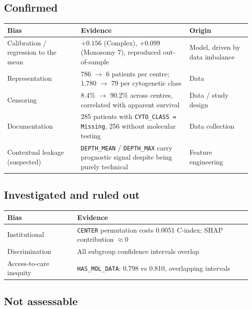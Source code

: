 \documentclass[11pt,a4paper]{article}
\newcommand{\var}[1]{\texttt{#1}}                      %
\begin{document}
\subsection{Confirmed}

\begin{longtable}{@{}p{4.2cm} p{6.5cm} p{3.8cm}@{}}
\toprule
\textbf{Bias} & \textbf{Evidence} & \textbf{Origin} \\
\midrule
\endhead
Calibration / regression to the mean & $+0.156$ (Complex), $+0.099$ (Monosomy 7), reproduced
out-of-sample & Model, driven by data imbalance \\
\addlinespace
Representation & 786 $\rightarrow$ 6 patients per centre; 1{,}780 $\rightarrow$ 79 per
cytogenetic class & Data \\
\addlinespace
Censoring & 8.4\% $\rightarrow$ 90.2\% across centres, correlated with apparent survival &
Data / study design \\
\addlinespace
Documentation & 285 patients with \var{CYTO\_CLASS = Missing}, 256 without molecular testing &
Data collection \\
\addlinespace
Contextual leakage (suspected) & \var{DEPTH\_MEAN} / \var{DEPTH\_MAX} carry prognostic signal
despite being purely technical & Feature engineering \\
\bottomrule
\end{longtable}

\subsection{Investigated and ruled out}

\begin{table}[h]
\centering
\begin{tabular}{@{}p{4.5cm} p{9cm}@{}}
\toprule
\textbf{Bias} & \textbf{Evidence} \\
\midrule
Institutional & \var{CENTER} permutation costs 0.0051 C-index; SHAP contribution $\approx 0$ \\
Discrimination & All subgroup confidence intervals overlap \\
Access-to-care inequity & \var{HAS\_MOL\_DATA}: 0.798 vs 0.810, overlapping intervals \\
\bottomrule
\end{tabular}
\end{table}

\subsection{Not assessable}
\end{document}
